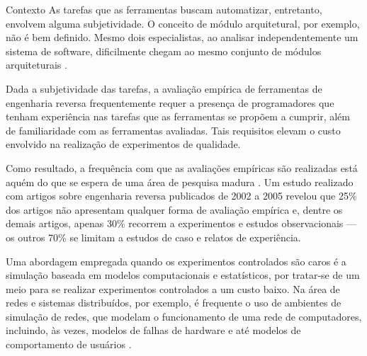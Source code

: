 \begin{section}{Contexto}
	As tarefas que as ferramentas buscam automatizar, entretanto, envolvem alguma subjetividade. O conceito de módulo arquitetural, por exemplo, não é bem definido. Mesmo dois especialistas, ao analisar independentemente um sistema de software, dificilmente chegam ao mesmo conjunto de módulos arquiteturais \cite{Koschke2000}. %

	Dada a subjetividade das tarefas, a avaliação empírica de ferramentas de engenharia reversa frequentemente requer a presença de programadores que tenham experiência nas tarefas que as ferramentas se propõem a cumprir, além de familiaridade com as ferramentas avaliadas. Tais requisitos elevam o custo envolvido na realização de experimentos de qualidade.
	 
	
	
	Como resultado, a frequência com que as avaliações empíricas são realizadas está aquém do que se espera de uma área de pesquisa madura \cite{Tonella2007}. Um estudo realizado com artigos sobre engenharia reversa publicados de 2002 a 2005 revelou que 25\% dos artigos não apresentam qualquer forma de avaliação empírica e, dentre os demais artigos, apenas 30\% recorrem a experimentos e estudos observacionais --- os outros 70\% se limitam a estudos de caso e relatos de experiência.


		Uma abordagem empregada quando os experimentos controlados são caros é a simulação baseada em modelos computacionais e estatísticos, por tratar-se de um meio para se realizar experimentos controlados a um custo baixo. Na área de redes e sistemas distribuídos, por exemplo, é frequente o uso de ambientes de simulação de redes, que modelam o funcionamento de uma rede de computadores, incluindo, às vezes, modelos de falhas de hardware e até modelos de comportamento de usuários \cite{White2002}. 
		

\end{section}
